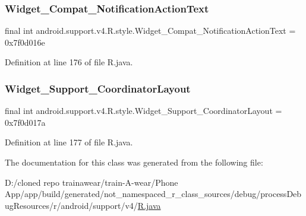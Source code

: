 \subsubsection{\texorpdfstring{Widget\_Compat\_NotificationActionText}{Widget\_Compat\_NotificationActionText}}
{\footnotesize\ttfamily final int android.\+support.\+v4.\+R.\+style.\+Widget\+\_\+\+Compat\+\_\+\+Notification\+Action\+Text = 0x7f0d016e\hspace{0.3cm}{\ttfamily [static]}}



Definition at line 176 of file R.\+java.

\mbox{\label{classandroid_1_1support_1_1v4_1_1_r_1_1style_abc274aabfe5c00cd05caa1f05494654b}} 
\subsubsection{\texorpdfstring{Widget\_Support\_CoordinatorLayout}{Widget\_Support\_CoordinatorLayout}}
{\footnotesize\ttfamily final int android.\+support.\+v4.\+R.\+style.\+Widget\+\_\+\+Support\+\_\+\+Coordinator\+Layout = 0x7f0d017a\hspace{0.3cm}{\ttfamily [static]}}



Definition at line 177 of file R.\+java.



The documentation for this class was generated from the following file\+:\begin{DoxyCompactItemize}
\item 
D\+:/cloned repo trainawear/train-\/\+A-\/wear/\+Phone App/app/build/generated/not\+\_\+namespaced\+\_\+r\+\_\+class\+\_\+sources/debug/process\+Debug\+Resources/r/android/support/v4/\mbox{\hyperlink{process_debug_resources_2r_2android_2support_2v4_2_r_8java}{R.\+java}}\end{DoxyCompactItemize}
